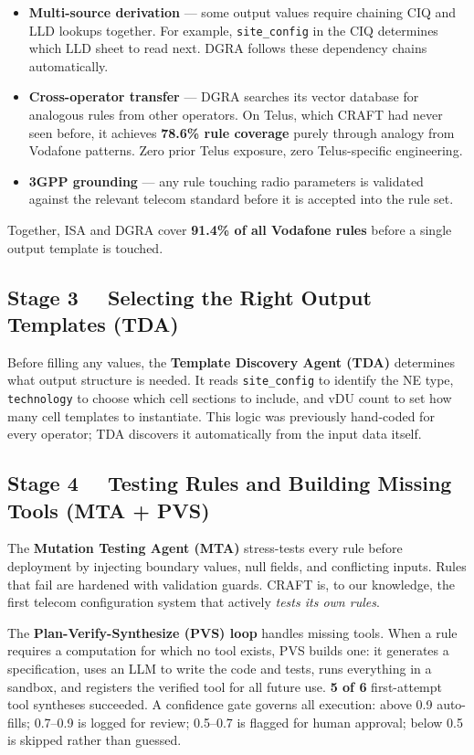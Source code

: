 \documentclass[10.5pt]{article}
\begin{document}
\begin{itemize}[leftmargin=1.4em, itemsep=4pt, topsep=3pt]
  \item \textbf{Multi-source derivation} --- some output values require chaining CIQ and LLD lookups together. For example, \texttt{site\_config} in the CIQ determines which LLD sheet to read next. DGRA follows these dependency chains automatically.
  \item \textbf{Cross-operator transfer} --- DGRA searches its vector database for analogous rules from other operators. On Telus, which CRAFT had never seen before, it achieves \textbf{78.6\% rule coverage} purely through analogy from Vodafone patterns. Zero prior Telus exposure, zero Telus-specific engineering.
  \item \textbf{3GPP grounding} --- any rule touching radio parameters is validated against the relevant telecom standard before it is accepted into the rule set.
\end{itemize}

Together, ISA and DGRA cover \textbf{91.4\% of all Vodafone rules} before a single output template is touched.

\subsection*{Stage 3 \ \ Selecting the Right Output Templates (TDA)}

Before filling any values, the \textbf{Template Discovery Agent (TDA)} determines what output structure is needed. It reads \texttt{site\_config} to identify the NE type, \texttt{technology} to choose which cell sections to include, and vDU count to set how many cell templates to instantiate. This logic was previously hand-coded for every operator; TDA discovers it automatically from the input data itself.

\subsection*{Stage 4 \ \ Testing Rules and Building Missing Tools (MTA + PVS)}

The \textbf{Mutation Testing Agent (MTA)} stress-tests every rule before deployment by injecting boundary values, null fields, and conflicting inputs. Rules that fail are hardened with validation guards. CRAFT is, to our knowledge, the first telecom configuration system that actively \emph{tests its own rules}.

The \textbf{Plan-Verify-Synthesize (PVS) loop} handles missing tools. When a rule requires a computation for which no tool exists, PVS builds one: it generates a specification, uses an LLM to write the code and tests, runs everything in a sandbox, and registers the verified tool for all future use. \textbf{5 of 6} first-attempt tool syntheses succeeded. A confidence gate governs all execution: above 0.9 auto-fills; 0.7--0.9 is logged for review; 0.5--0.7 is flagged for human approval; below 0.5 is skipped rather than guessed.
\end{document}
